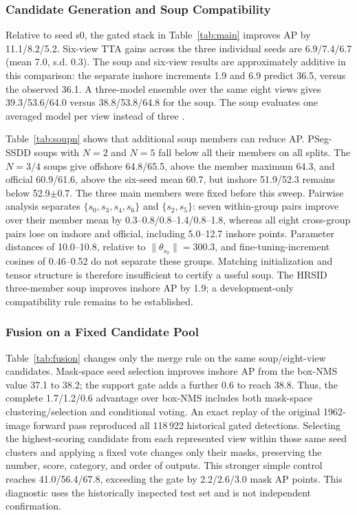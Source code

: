 \subsubsection{Candidate Generation and Soup Compatibility}\label{sec:exp:main}
Relative to seed s0, the gated stack in Table~\ref{tab:main} improves AP by 11.1/8.2/5.2. Six-view TTA gains across the three individual seeds are 6.9/7.4/6.7 (mean 7.0, s.d. 0.3). The soup and six-view results are approximately additive in this comparison: the separate inshore increments 1.9 and 6.9 predict 36.5, versus the observed 36.1. A three-model ensemble over the same eight views gives 39.3/53.6/64.0 versus 38.8/53.8/64.8 for the soup. The soup evaluates one averaged model per view instead of three \cite{modelsoups2022}.

Table~\ref{tab:soupn} shows that additional soup members can reduce AP. PSeg-SSDD soups with $N=2$ and $N=5$ fall below all their members on all splits. The $N=3/4$ soups give offshore 64.8/65.5, above the member maximum 64.3, and official 60.9/61.6, above the six-seed mean 60.7, but inshore 51.9/52.3 remains below 52.9$\pm$0.7. The three main members were fixed before this sweep. Pairwise analysis separates $\{s_0,s_3,s_4,s_6\}$ and $\{s_2,s_5\}$: seven within-group pairs improve over their member mean by 0.3--0.8/0.8--1.4/0.8--1.8, whereas all eight cross-group pairs lose on inshore and official, including 5.0--12.7 inshore points. Parameter distances of 10.0--10.8, relative to $\|\theta_{s_0}\|=300.3$, and fine-tuning-increment cosines of 0.46--0.52 do not separate these groups. Matching initialization and tensor structure is therefore insufficient to certify a useful soup. The HRSID three-member soup improves inshore AP by 1.9; a development-only compatibility rule remains to be established.


\subsubsection{Fusion on a Fixed Candidate Pool}\label{sec:exp:fusion}
Table~\ref{tab:fusion} changes only the merge rule on the same soup/eight-view candidates. Mask-space seed selection improves inshore AP from the box-NMS value 37.1 to 38.2; the support gate adds a further 0.6 to reach 38.8. Thus, the complete 1.7/1.2/0.6 advantage over box-NMS includes both mask-space clustering/selection and conditional voting. An exact replay of the original 1962-image forward pass reproduced all 118\,922 historical gated detections. Selecting the highest-scoring candidate from each represented view within those same seed clusters and applying a fixed vote changes only their masks, preserving the number, score, category, and order of outputs. This stronger simple control reaches 41.0/56.4/67.8, exceeding the gate by 2.2/2.6/3.0 mask AP points. This diagnostic uses the historically inspected test set and is not independent confirmation.

